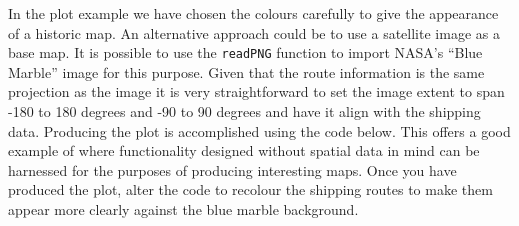 \documentclass[]{article}
\begin{document}
In the plot example we have chosen the colours carefully to give the
appearance of a historic map. An alternative approach could be to use a
satellite image as a base map. It is possible to use the
\texttt{readPNG} function to import NASA's ``Blue Marble'' image for
this purpose. Given that the route information is the same projection as
the image it is very straightforward to set the image extent to span
-180 to 180 degrees and -90 to 90 degrees and have it align with the
shipping data. Producing the plot is accomplished using the code below.
This offers a good example of where functionality designed without
spatial data in mind can be harnessed for the purposes of producing
interesting maps. Once you have produced the plot, alter the code to
recolour the shipping routes to make them appear more clearly against
the blue marble background.
\end{document}
